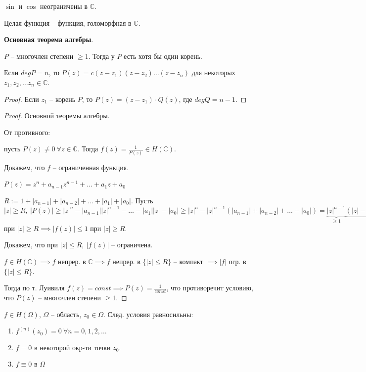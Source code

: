 \begin{remark}
    $\sin$ и $\cos$ неограничены в $\mathbb{C}$.
\end{remark}

\begin{definition}
    Целая функция -- функция, голоморфная в $\mathbb{C}$.
\end{definition}

\begin{theorem}
    \textbf{Основная теорема алгебры}.

    $P$ -- многочлен степени $\geq 1$. Тогда у $P$ есть хотя бы один корень.
\end{theorem}
\begin{consequence}
    Если $deg P = n$, то $P(z) = c(z - z_1)(z - z_2) \dots (z - z_n)$ для некоторых $z_1, z_2, \dots z_n \in \mathbb{C}$.
\end{consequence}
\begin{proof}
    Если $z_1$ -- корень $P$, то $P(z) = (z - z_1) \cdot Q(z)$, где $deg Q = n - 1$.
\end{proof}
\begin{proof}
    Основной теоремы алгебры.

    От противного:

    пусть $P(z) \not = 0 \ \forall z \in \mathbb{C}$. Тогда $f(z) = \frac{1}{P(z)} \in H(\mathbb{C})$.

    Докажем, что $f$ -- ограниченная функция.

    $P(z) = z^n + a_{n-1} z^{n-1} + \dots + a_1 z + a_0$

    $R := 1 + |a_{n-1}| + |a_{n-2}| + \dots + |a_1| + |a_0|$. Пусть $|z| \geq R, \ |P(z)| \geq |z|^n - |a_{n-1}| |z|^{n-1} - \dots - |a_1| |z| - |a_0| \geq |z|^n - |z|^{n-1} (|a_{n-1}| + |a_{n-2}| + \dots + |a_0|) = \underbrace{|z|^{n-1}}_{\geq 1} \underbrace{(|z| - |a_0| - |a_1| - \dots - |a_{n-1}|)}_{\geq 1} \implies |P(z)| \geq 1$ при $|z| \geq R \implies |f(z)| \leq 1$ при $|z| \geq R$.

    Докажем, что при $|z| \leq R, \ |f(z)|$ -- ограничена.

    $f \in H(\mathbb{C}) \implies f$ непрер. в $\mathbb{C} \implies f$ непрер. в $\{ |z| \leq R \}$ -- компакт $\implies |f|$ огр. в $\{ |z| \leq R \}$.

    Тогда по т. Луивиля $f(z) = const \implies P(z) = \frac{1}{const}$, что противоречит условию, что $P(z)$ -- многочлен степени $\geq 1$.
\end{proof}


\begin{theorem}
    $f \in H(\Omega)$, $\Omega$ -- область, $z_0 \in \Omega$. След. условия равносильны:

    \begin{enumerate}
        \item {
            $f^{(n)} (z_0) = 0 \ \forall n = 0, 1, 2, \dots$
        }
        \item {
            $f = 0$ в некоторой окр-ти точки $z_0$.
        }
        \item {
            $f \equiv 0$ в $\Omega$
        }
    \end{enumerate}
\end{theorem}


